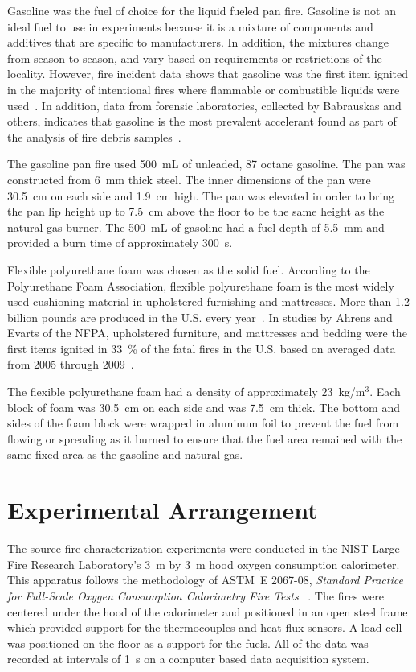\documentclass[twoside]{uocthesis}
\begin{document}
{Gasoline was the fuel of choice for the liquid fueled pan fire.  Gasoline is not an ideal fuel to use in experiments because it is a mixture of components and additives that are specific to manufacturers. In addition, the mixtures change from season to season, and vary based on requirements or restrictions of the locality.  However, fire incident data shows that gasoline was the first item ignited in the majority of intentional fires where flammable or combustible liquids were used~\cite{Rohr:2001}. In addition, data from forensic laboratories, collected by Babrauskas and others, indicates that gasoline is the most prevalent accelerant found as part of the analysis of fire debris samples~\cite{Babrauskas:2003,Chasteen:2010}.

The gasoline pan fire used 500~mL of unleaded, 87 octane gasoline.  The pan was constructed from 6~mm thick steel.  The inner dimensions of the pan were 30.5~cm on each side and 1.9~cm high.  The pan was elevated in order to bring the pan lip height up to 7.5~cm above the floor to be the same height as the natural gas burner.  The 500~mL of gasoline had a fuel depth of 5.5~mm and provided a burn time of approximately 300~s.

Flexible polyurethane foam was chosen as the solid fuel. According to the Polyurethane Foam Association, flexible polyurethane foam is the most widely used cushioning material in upholstered furnishing and mattresses. More than 1.2 billion pounds are produced in the U.S. every year~\cite{Foam,Polyurethane_Foam}. In studies by Ahrens and Evarts of the NFPA, upholstered furniture, and mattresses and bedding were the first items ignited in 33~\% of the fatal fires in the U.S. based on averaged data from 2005 through 2009~\cite{Ahrens:2011,Evarts:2011}.

The flexible polyurethane foam had a density of approximately 23~kg/m$^3$.  Each block of foam was 30.5~cm on each side and was 7.5~cm thick. The bottom and sides of the foam block were wrapped in aluminum foil to prevent the fuel from flowing or spreading as it burned to ensure that the fuel area remained with the same fixed area as the gasoline and natural gas.

\section{Experimental Arrangement}

The source fire characterization experiments were conducted in the NIST Large Fire Research Laboratory's 3~m by 3~m hood oxygen consumption calorimeter. This apparatus follows the methodology of ASTM~E 2067-08, {\em Standard Practice for Full-Scale Oxygen Consumption Calorimetry Fire Tests} ~\cite{ASTM_E2067}. The fires were centered under the hood of the calorimeter and positioned in an open steel frame which provided support for the thermocouples and heat flux sensors. A load cell was positioned on the floor as a support for the fuels.  All of the data was recorded at intervals of 1~s on a computer based data acquisition system.

}
\end{document}
